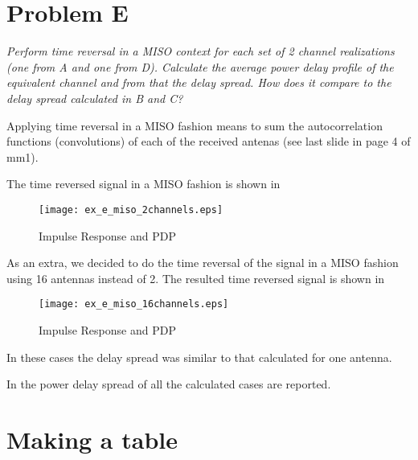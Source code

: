\section{Problem E}
\textit{Perform time reversal in a MISO context for each set of 2 channel realizations (one from A and one from D). Calculate the average power delay profile of the equivalent channel and from that the delay spread. How does it compare to the delay spread calculated in B and C?}

Applying time reversal in a MISO fashion means to sum the autocorrelation functions (convolutions) of each of the received antenas (see last slide in page 4 of mm1).


The time reversed signal in a MISO fashion is shown in 

\begin{figure}
\centering
\texttt{[image: ex\_e\_miso\_2channels.eps]}
\caption{Impulse Response and PDP}\label{fig:ex_e_miso_2channels}
\end{figure}

As an extra, we decided to do the time reversal of the signal in a MISO fashion using 16 antennas instead of 2. The resulted time reversed signal is shown in 

\begin{figure}
\centering
\texttt{[image: ex\_e\_miso\_16channels.eps]}
\caption{Impulse Response and PDP}\label{fig:ex_e_miso_16channels}
\end{figure}

In these cases the delay spread was similar to that calculated for one antenna.

In  the power delay spread of all the calculated cases are reported.

\section{Making a table} 
